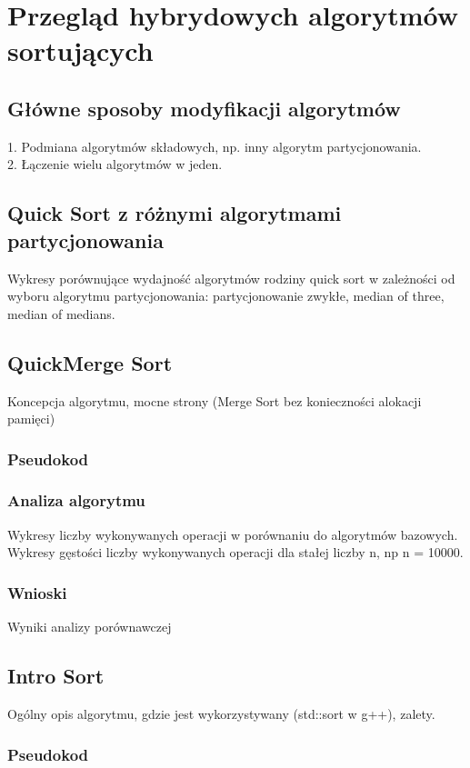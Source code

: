 \chapter{Przegląd hybrydowych algorytmów sortujących}
\thispagestyle{chapterBeginStyle}

\section{Główne sposoby modyfikacji algorytmów}
1. Podmiana algorytmów składowych, np. inny algorytm partycjonowania.\\
2. Łączenie wielu algorytmów w jeden.

\section{Quick Sort z różnymi algorytmami partycjonowania}
Wykresy porównujące wydajność algorytmów rodziny quick sort w zależności od wyboru algorytmu partycjonowania:
partycjonowanie zwykłe, median of three, median of medians.


\section{QuickMerge Sort}
Koncepcja algorytmu, mocne strony (Merge Sort bez konieczności alokacji pamięci)

\subsection{Pseudokod}

\subsection{Analiza algorytmu}
Wykresy liczby wykonywanych operacji w porównaniu do algorytmów bazowych.
Wykresy gęstości liczby wykonywanych operacji dla stałej liczby n, np n = 10000.

\subsection{Wnioski}
Wyniki analizy porównawczej


\section{Intro Sort}
Ogólny opis algorytmu, gdzie jest wykorzystywany (std::sort w g++), zalety.

\subsection{Pseudokod}

